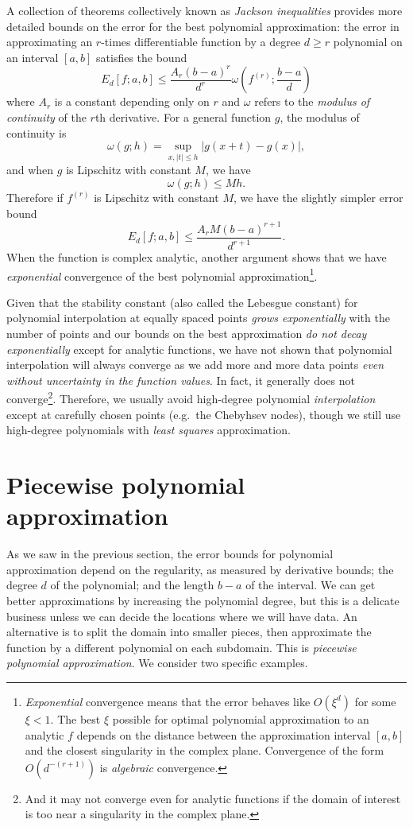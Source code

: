 \documentclass[12pt, leqno]{article} %
\begin{document}
A collection of theorems collectively known as {\em Jackson
  inequalities} provides more detailed bounds on the error for the
best polynomial approximation: the error in approximating an $r$-times
differentiable function by a degree $d \geq r$ polynomial on an interval
$[a,b]$ satisfies the bound
\[
  E_d[f; a,b] \leq \frac{A_r(b-a)^r}{d^r}
    \omega\left( f^{(r)}; \frac{b-a}{d} \right)
\]
where $A_r$ is a constant depending only on $r$ and $\omega$ refers
to the {\em modulus of continuity} of the $r$th derivative.
For a general function $g$, the modulus of continuity is
\[
  \omega(g; h) = \sup_{x, |t| \leq h} |g(x+t)-g(x)|,
\]
and when $g$ is Lipschitz with constant $M$, we have
\[
  \omega(g; h) \leq Mh.
\]
Therefore if $f^{(r)}$ is Lipschitz with constant $M$, we have the
slightly simpler error bound
\[
  E_d[f; a,b] \leq \frac{A_r M (b-a)^{r+1}}{d^{r+1}}.
\]
When the function is complex analytic, another argument shows that we
have {\em exponential} convergence of the best polynomial
approximation\footnote{%
  {\em Exponential} convergence means that the error behaves like $O(\xi^d)$
  for some $\xi < 1$.  The best $\xi$ possible for optimal polynomial
  approximation to an analytic $f$ depends on the distance
  between the approximation interval $[a,b]$ and the closest
  singularity in the complex plane.  Convergence of the form $O(d^{-(r+1)})$ is
  {\em algebraic} convergence.
}.

Given that the stability constant (also called the Lebesgue constant)
for polynomial interpolation at equally spaced points {\em grows
  exponentially} with the number of points and our bounds on the best
approximation {\em do not decay exponentially} except for analytic
functions, we have not shown that polynomial interpolation will always
converge as we add more and more data points {\em even without
  uncertainty in the function values}.  In fact, it generally does not
converge\footnote{And it may not converge even for analytic functions
  if the domain of interest is too near a singularity in the complex
  plane.}.  Therefore, we usually avoid high-degree polynomial {\em
  interpolation} except at carefully chosen points (e.g.~the Chebyhsev
nodes), though we still use high-degree polynomials with {\em least
  squares} approximation.

\section{Piecewise polynomial approximation}

As we saw in the previous section, the error bounds for polynomial
approximation depend on the regularity, as measured by derivative
bounds; the degree $d$ of the polynomial; and the length $b-a$ of the
interval.  We can get better approximations by increasing the
polynomial degree, but this is a delicate business unless we can
decide the locations where we will have data.  An alternative is
to split the domain into smaller pieces, then approximate the function
by a different polynomial on each subdomain.
This is {\em piecewise polynomial approximation}.  We consider two
specific examples.
\end{document}
